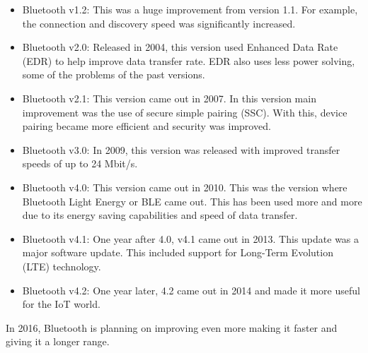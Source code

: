 \documentclass[11pt,a4paper]{article}
\begin{document}
{\begin{itemize}
\item Bluetooth v1.2: This was a huge improvement from version 1.1. For example, the connection and discovery speed was significantly increased.

\item Bluetooth v2.0: Released in 2004, this version used Enhanced Data Rate (EDR) to help improve data transfer rate. EDR also uses less power solving, some of the problems of the past versions.

\item Bluetooth v2.1: This version came out in 2007. In this version main improvement was the use of secure simple pairing (SSC). With this, device pairing became more efficient and security was improved.

\item Bluetooth v3.0: In 2009, this version was released with improved transfer speeds of up to 24 Mbit/s.

\item Bluetooth v4.0: This version came out in 2010. This was the version where Bluetooth Light Energy or BLE came out. This has been used more and more due to its energy saving capabilities and speed of data transfer.

\item Bluetooth v4.1: One year after 4.0, v4.1 came out in 2013. This update was a major software update. This included support for Long-Term Evolution (LTE) technology.

\item Bluetooth v4.2: One year later, 4.2 came out in 2014 and made it more useful for the IoT world.

\end{itemize}
In 2016, Bluetooth is planning on improving even more making it faster and giving it a longer range.
}

    \newpage
\end{document}
